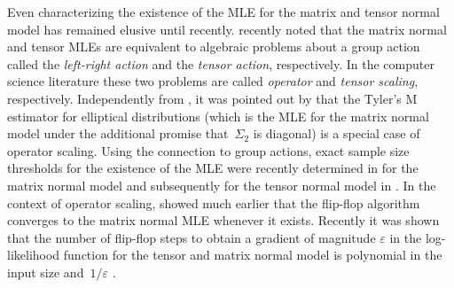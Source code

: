 \documentclass[aos]{imsart}
\theoremstyle{definition}
\numberwithin{equation}{section}
\newcommand{\eps}{\varepsilon}
\newcommand{\CF}[1]{{\color{purple}[CF: #1]}}
\begin{document}
Even characterizing the existence of the MLE for the matrix and tensor normal model has remained elusive until recently.
\cite{amendola2020invariant} recently noted that the matrix normal and tensor MLEs are equivalent to algebraic problems about a group action called the \emph{left-right action} and the \emph{tensor action}, respectively.
In the computer science literature these two problems are called \emph{operator} and \emph{tensor scaling}, respectively.
Independently from \cite{amendola2020invariant}, it was pointed out by \cite{FM20} that the Tyler's M estimator for elliptical distributions (which is the MLE for the matrix normal model under the additional promise that~$\Sigma_2$ is diagonal) is a special case of operator scaling.
Using the connection to group actions, exact sample size thresholds for the existence of the MLE were recently determined in \cite{derksen2020matrix} for the matrix normal model and subsequently for the tensor normal model in \cite{derksen2020tensor}.
In the context of operator scaling, \cite{gurvits2004classical} showed much earlier that the flip-flop algorithm converges to the matrix normal MLE whenever it exists.
Recently it was shown that the number of flip-flop steps to obtain a gradient of magnitude $\eps$ in the log-likelihood function for the tensor and matrix normal model is polynomial in the input size and~$1/\eps$ \citep{GGOW19,burgisser2017alternating,burgisser2019towards}.


\end{document}
